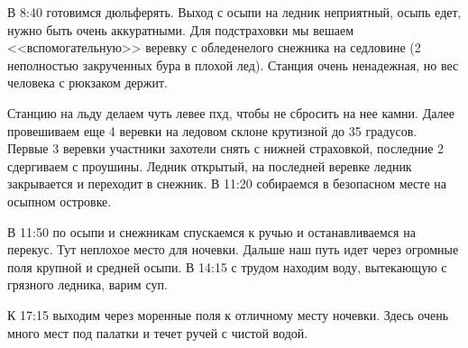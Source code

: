 В 8:40 готовимся дюльферять. Выход с осыпи на ледник неприятный, осыпь едет, нужно быть очень аккуратными. Для подстраховки мы вешаем <<вспомогательную>> веревку с обледенелого снежника на седловине (2 неполностью закрученных бура в плохой лед). Станция очень ненадежная, но вес человека с рюкзаком держит.

Станцию на льду делаем чуть левее пхд, чтобы не сбросить на нее камни. Далее провешиваем еще 4 веревки на ледовом склоне крутизной до 35 градусов. Первые 3 веревки участники захотели снять с нижней страховкой, последние 2 сдергиваем с проушины. Ледник открытый, на последней веревке ледник закрывается и переходит в снежник. В 11:20 собираемся в безопасном месте на осыпном островке.

В 11:50 по осыпи и снежникам спускаемся к ручью и останавливаемся на перекус. Тут неплохое место для ночевки. Дальше наш путь идет через огромные поля крупной и средней осыпи. В 14:15 с трудом находим воду, вытекающую с грязного ледника, варим суп.

К 17:15 выходим через моренные поля к отличному месту ночевки. Здесь очень много мест под палатки и течет ручей с чистой водой.














